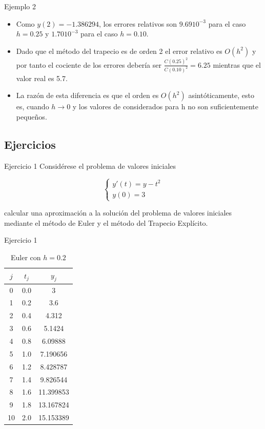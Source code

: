 		\begin{frame}{Ejemplo 2}
			\begin{itemize}
				\item Como $y(2)=-1.386294$, los errores relativos son $9.69 10^{-3}$ para el caso $h=0.25$ y $1.70 10^{-3}$ para el caso $h=0.10$.
				\item Dado que el método del trapecio es de orden 2 el error relativo es $O(h^2)$ y por tanto el cociente de los errores debería ser $\frac{C(0.25)^2}{C(0.10)^2}=6.25$ mientras que el valor real es 5.7. 
				\item La razón de esta diferencia es que el orden es $O(h^2)$ asintóticamente, esto es, cuando $h \to 0$ y los valores de considerados para h no son suficientemente pequeños.
			\end{itemize}			
		\end{frame}
		
	\subsection{Ejercicios}
	
		\begin{frame}{Ejercicio 1}
			 Considérese el problema de valores iniciales
		 
			 \begin{equation*}
			 \begin{cases}
			 y'(t) = y - t^2 \\
			 y(0) = 3
			 \end{cases}
			 \end{equation*}
		 
			 calcular una aproximación a la solución del problema de valores iniciales mediante el método de Euler y el método del Trapecio Explícito.						
		\end{frame}
		
		\begin{frame}{Ejercicio 1}
			\begin{table}[H]
				\centering
				\begin{tabular}{|| c | c | c ||}
					\hline
					\hline $j$ &  $t_j $ & $y_j$\\
					\hline 0 & 0.0 & 3 \\
					\hline 1 & 0.2 & 3.6  \\
					\hline 2 & 0.4 & 4.312 \\
					\hline 3 & 0.6 & 5.1424 \\
					\hline 4 & 0.8 & 6.09888 \\
					\hline 5 & 1.0 & 7.190656 \\
					\hline 6 & 1.2 & 8.428787 \\
					\hline 7 & 1.4 & 9.826544 \\
					\hline 8 & 1.6 & 11.399853 \\
					\hline 9 & 1.8 & 13.167824 \\
					\hline 10 & 2.0 & 15.153389 \\
					\hline
					\hline
				\end{tabular}
				\caption{Euler con $h=0.2$}
			\end{table}								
		\end{frame}
		

